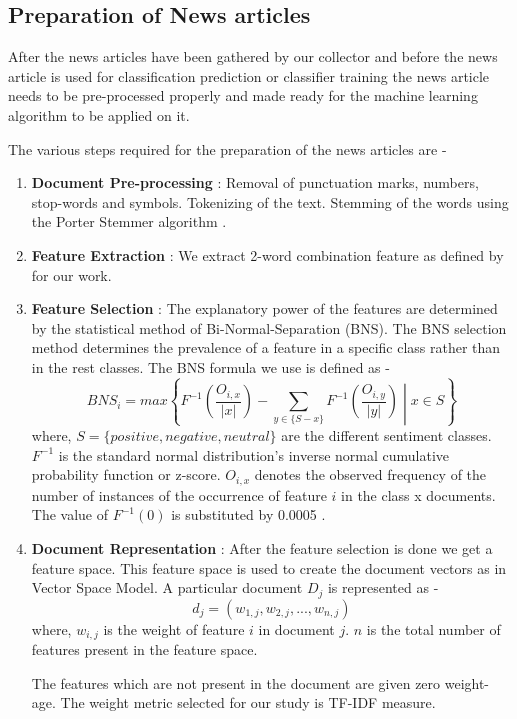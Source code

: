 \documentclass[review,twocolumn,5p]{elsarticle}
\begin{document}
\subsection{Preparation of News articles}
After the news articles have been gathered by our collector and before the news article is used for classification prediction or classifier training the news article needs to be pre-processed properly and made ready for the machine learning algorithm to be applied on it. 

The various steps required for the preparation of the news articles are - 
\begin{enumerate}
\item  \textbf{Document Pre-processing} : Removal of punctuation marks, numbers, stop-words and symbols. Tokenizing of the text. Stemming of the words using the Porter Stemmer algorithm \cite{porter1980algorithm}. 

\item \textbf{Feature Extraction} :  We extract 2-word combination feature as defined by \cite{Hagenau:2013} for our work.

\item \textbf{Feature Selection} :  The explanatory power of the features are determined by the statistical method of Bi-Normal-Separation (BNS). The BNS selection method determines the prevalence of a feature in a specific class rather than in the rest classes. The BNS formula we use is defined as - 
\begin{equation}
\label{eq:bns}
BNS_{i} = max \left\{ F^{-1} \left(\frac{O_{i,x}}{|x|}\right) - \sum_{y \in \{S - x\}} F^{-1} \left(\frac{O_{i,y}}{|y|}\right)  \middle| x \in S \right\}
\end{equation}
where, $S = \{ positive, negative, neutral \}$ are the different sentiment classes. $F^{-1}$ is the standard normal distribution's inverse normal cumulative probability function or z-score. $O_{i,x}$ denotes the observed frequency of the number of instances of the occurrence of feature $i$ in the class x documents. The value of $F^{-1}(0)$ is substituted by 0.0005 \cite{Forman:2003}.

\item \textbf{Document Representation} : After the feature selection is done we get a feature space. This feature space is used to create the document vectors as in Vector Space Model. A particular document $D_{j}$ is represented as - 
\begin{equation}
d_{j} = ( w_{1,j} , w_{2,j} , ... , w_{n,j} )
\end{equation}
where, $w_{i,j}$ is the weight of feature $i$ in document $j$. $n$ is the total number of features present in the feature space. 

The features which are not present in the document are given zero weight-age. The weight metric selected for our study is TF-IDF measure.
\end{enumerate}
\end{document}
